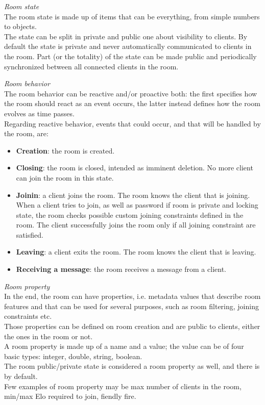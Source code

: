 \bigskip
\textit{Room state}
\\
The room state is made up of items that can be everything, from simple numbers to objects.   
\\
The state can be split in private and public one about visibility to clients. By default the state is private and never automatically communicated to clients in the room. Part (or the totality) of the state can be made public and periodically synchronized between all connected clients in the room.

\bigskip
\textit{Room behavior}
\\
The room behavior can be reactive and/or proactive both: the first specifies how the room should react as an event occurs, the latter instead defines how the room evolves as time passes.
\\
Regarding reactive behavior, events that could occur, and that will be handled by the room, are:
\begin{itemize}
\item \textbf{Creation}: the room is created.
\item \textbf{Closing}: the room is closed, intended as imminent deletion. No more client can join the room in this state. 
\item \textbf{Joinin}: a client joins the room. The room knows the client that is joining. When a client tries to join, as well as password if room is private and locking state, the room checks possible custom joining constraints defined in the room. The client successfully joins the room only if all joining constraint are satisfied.
\item \textbf{Leaving}: a client exits the room. The room knows the client that is leaving.
\item \textbf{Receiving a message}: the room receives a message from a client.
\end{itemize} 

\bigskip
\textit{Room property}
\\  
In the end, the room can have properties, i.e. metadata values that describe room features and that can be used for several purposes, such as room filtering, joining constraints etc.
\\
Those properties can be defined on room creation and are public to clients, either the ones in the room or not.
\\
A room property is made up of a name and a value; the value can be of four basic types: integer, double, string, boolean. 
\\
The room public/private state is considered a room property as well, and there is by default.
\\
Few examples of room property may be max number of clients in the room, min/max Elo required to join, fiendly fire.


